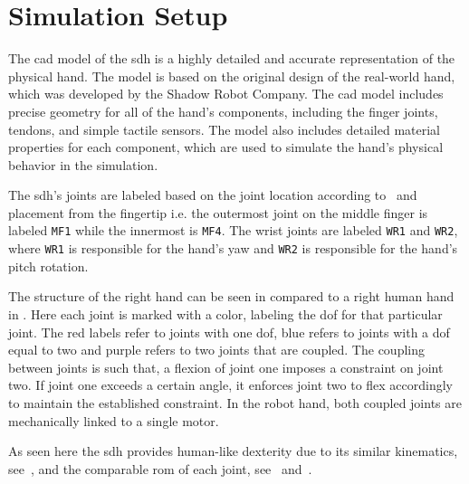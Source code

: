 \section{Simulation Setup}\label{sec:system-setup-simulation-setup}

The \gls{cad} model of the \gls{sdh} is a highly detailed and accurate representation of the physical hand. The model is based on the original design of the real-world hand, which was developed by the Shadow Robot Company. The \gls{cad} model includes precise geometry for all of the hand's components, including the finger joints, tendons, and simple tactile sensors. The model also includes detailed material properties for each component, which are used to simulate the hand's physical behavior in the simulation.\medskip

The \gls{sdh}'s joints are labeled based on the joint location according to~ and placement from the fingertip i.e. the outermost joint on the middle finger is labeled \texttt{MF1} while the innermost is \texttt{MF4}. The wrist joints are labeled \texttt{WR1} and \texttt{WR2}, where \texttt{WR1} is responsible for the hand's yaw and \texttt{WR2} is responsible for the hand's pitch rotation. \medskip

The structure of the right hand can be seen in  compared to a right human hand in . Here each joint is marked with a color, labeling the \gls{dof} for that particular joint. The red labels refer to joints with one \gls{dof}, blue refers to joints with a \gls{dof} equal to two and purple refers to two joints that are coupled. The coupling between joints is such that, a flexion of joint one imposes a constraint on joint two. If joint one exceeds a certain angle, it enforces joint two to flex accordingly to maintain the established constraint. In the robot hand, both coupled joints are mechanically linked to a single motor. \medskip

As seen here the \gls{sdh} provides human-like dexterity due to its similar kinematics, see~, and the comparable \gls{rom} of each joint, see~ and~. \medskip

